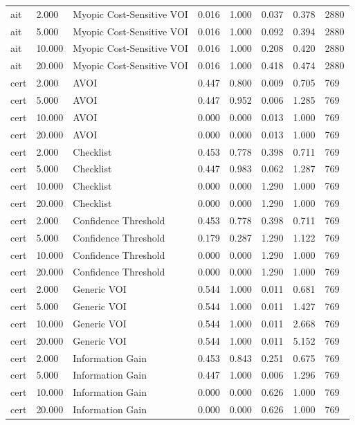 \begin{table}[!ht]
{\begin{tabular}{llllllll}
ait & 2.000 & Myopic Cost-Sensitive VOI & 0.016 & 1.000 & 0.037 & 0.378 & 2880 \\
ait & 5.000 & Myopic Cost-Sensitive VOI & 0.016 & 1.000 & 0.092 & 0.394 & 2880 \\
ait & 10.000 & Myopic Cost-Sensitive VOI & 0.016 & 1.000 & 0.208 & 0.420 & 2880 \\
ait & 20.000 & Myopic Cost-Sensitive VOI & 0.016 & 1.000 & 0.418 & 0.474 & 2880 \\
cert & 2.000 & AVOI & 0.447 & 0.800 & 0.009 & 0.705 & 769 \\
cert & 5.000 & AVOI & 0.447 & 0.952 & 0.006 & 1.285 & 769 \\
cert & 10.000 & AVOI & 0.000 & 0.000 & 0.013 & 1.000 & 769 \\
cert & 20.000 & AVOI & 0.000 & 0.000 & 0.013 & 1.000 & 769 \\
cert & 2.000 & Checklist & 0.453 & 0.778 & 0.398 & 0.711 & 769 \\
cert & 5.000 & Checklist & 0.447 & 0.983 & 0.062 & 1.287 & 769 \\
cert & 10.000 & Checklist & 0.000 & 0.000 & 1.290 & 1.000 & 769 \\
cert & 20.000 & Checklist & 0.000 & 0.000 & 1.290 & 1.000 & 769 \\
cert & 2.000 & Confidence Threshold & 0.453 & 0.778 & 0.398 & 0.711 & 769 \\
cert & 5.000 & Confidence Threshold & 0.179 & 0.287 & 1.290 & 1.122 & 769 \\
cert & 10.000 & Confidence Threshold & 0.000 & 0.000 & 1.290 & 1.000 & 769 \\
cert & 20.000 & Confidence Threshold & 0.000 & 0.000 & 1.290 & 1.000 & 769 \\
cert & 2.000 & Generic VOI & 0.544 & 1.000 & 0.011 & 0.681 & 769 \\
cert & 5.000 & Generic VOI & 0.544 & 1.000 & 0.011 & 1.427 & 769 \\
cert & 10.000 & Generic VOI & 0.544 & 1.000 & 0.011 & 2.668 & 769 \\
cert & 20.000 & Generic VOI & 0.544 & 1.000 & 0.011 & 5.152 & 769 \\
cert & 2.000 & Information Gain & 0.453 & 0.843 & 0.251 & 0.675 & 769 \\
cert & 5.000 & Information Gain & 0.447 & 1.000 & 0.006 & 1.296 & 769 \\
cert & 10.000 & Information Gain & 0.000 & 0.000 & 0.626 & 1.000 & 769 \\
cert & 20.000 & Information Gain & 0.000 & 0.000 & 0.626 & 1.000 & 769 \\

\end{tabular}}
\end{table}
